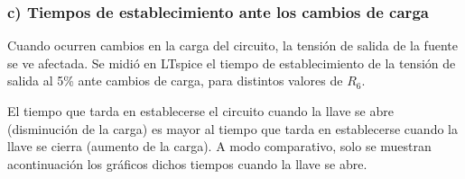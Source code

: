 \documentclass[e4_tp2_main.tex]{subfiles}
\begin{document}
\subsubsection*{c) Tiempos de establecimiento ante los cambios de carga }

Cuando ocurren cambios en la carga del circuito, la tensi\'on de salida de la fuente se ve afectada. Se midi\'o en LTspice el tiempo de establecimiento de la tensi\'on de salida al 5\% ante cambios de carga, para distintos valores de $R_6$. 

El tiempo que tarda en establecerse el circuito cuando la llave se abre (disminuci\'on de la carga) es mayor al tiempo que tarda en establecerse cuando la llave se cierra (aumento de la carga). A modo comparativo, solo se muestran acontinuaci\'on los gr\'aficos dichos tiempos cuando la llave se abre.  
\end{document}
